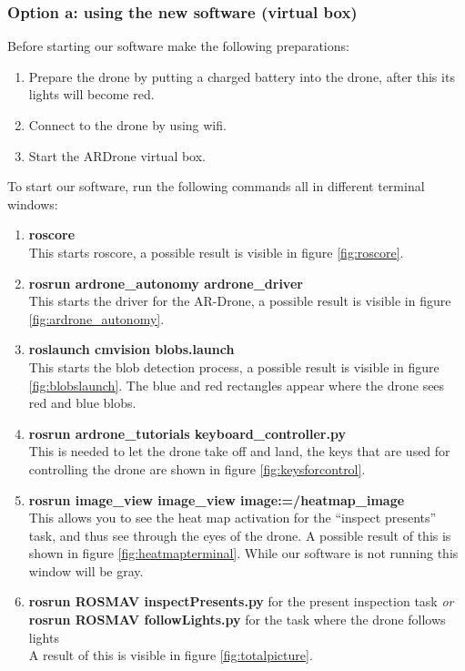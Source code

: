 \documentclass[a4paper,10pt]{article}
\begin{document}
\subsubsection{Option a: using the new software (virtual box)}
Before starting our software make the following preparations: 
\begin{enumerate}
	\item Prepare the drone by putting a charged battery into the drone, after this its lights will become red.
	\item Connect to the drone by using wifi. 
	\item Start the ARDrone virtual box.  
\end{enumerate}
To start our software, run the following commands all in different terminal windows:
\begin{enumerate}
\item \textbf{roscore} \\ This starts roscore, a possible result is visible in figure \ref{fig:roscore}.
\item \textbf{rosrun ardrone\_autonomy ardrone\_driver} \\ This starts the driver for the AR-Drone, a possible result is visible in figure \ref{fig:ardrone_autonomy}.
\item \textbf{roslaunch cmvision blobs.launch} \\ This starts the blob detection process, a possible result is visible in figure \ref{fig:blobslaunch}. The blue and red rectangles appear where the drone sees red and blue blobs. 
\item \textbf{rosrun ardrone\_tutorials keyboard\_controller.py} \\ This is needed to let the drone take off and land, the keys that are used for controlling the drone are shown in figure \ref{fig:keysforcontrol}.
\item \textbf{rosrun image\_view image\_view image:=/heatmap\_image} \\ This
      allows you to see the heat map activation for the ``inspect presents''
      task, and thus see through the eyes of the drone. A possible result of this is shown in figure \ref{fig:heatmapterminal}. While our software is not running this window will be gray. 
\item \textbf{rosrun ROSMAV inspectPresents.py} for the present inspection task \textit{or} \\
      \textbf{rosrun ROSMAV followLights.py} for the task where the drone follows lights\\
      A result of this is visible in figure \ref{fig:totalpicture}.
\end{enumerate}
\end{document}
